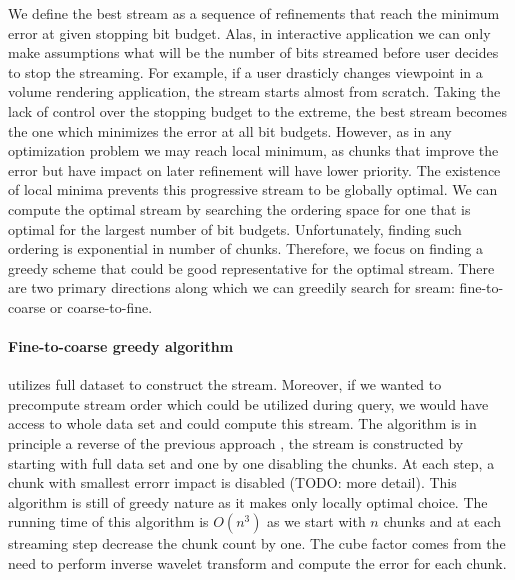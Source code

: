 We define the best stream as a sequence of refinements that reach the minimum error at given
stopping bit budget. Alas, in interactive application we can only make assumptions what will be the
number of bits streamed before user decides to stop the streaming. For example, if a user drasticly
changes viewpoint in a volume rendering application, the stream starts almost from scratch. Taking
the lack of control over the stopping budget to the extreme, the best stream becomes the one which
minimizes the error at all bit budgets. However, as in any optimization problem we may reach local
minimum, as chunks that improve the error but have impact on later refinement will have lower
priority.  The existence of local minima prevents this progressive stream to be globally optimal. We
can compute the optimal stream by searching the ordering space for one that is optimal for the
largest number of bit budgets. Unfortunately, finding such ordering is exponential in number of
chunks. Therefore, we focus on finding a greedy scheme that could be good representative for the
optimal stream. There are two primary directions along which we can greedily search for sream:
fine-to-coarse or coarse-to-fine.

\paragraph*{Fine-to-coarse greedy algorithm} utilizes full dataset to construct the stream.
Moreover, if we wanted to precompute stream order which could be utilized during query, we would
have access to whole data set and could compute this stream. The algorithm is in principle a reverse
of the previous approach , the stream is constructed by starting with full data set and one by one
disabling the chunks. At each step, a chunk with smallest errorr impact is disabled (TODO: more
detail). This algorithm is still of greedy nature as it makes only locally optimal choice. The
running time of this algorithm is $O(n^3)$ as we start with $n$ chunks and at each streaming step
decrease the chunk count by one. The cube factor comes from the need to perform inverse wavelet
transform and compute the error for each chunk.

